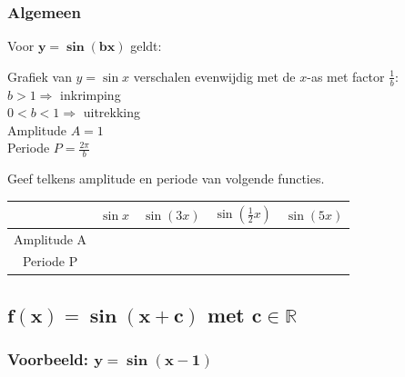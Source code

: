 \documentclass[a4paper,12pt,twoside]{article}
\begin{document}
\needspace{3cm}
\subsubsection*{Algemeen}

\begin{mdframed}[nobreak=true]
  Voor $\boldsymbol{y=\sin (bx)}$ geldt:
  \begin{center}
    Grafiek van $y=\sin x$ verschalen evenwijdig met de $x$-as met factor $\frac{1}{b}$:\\
    $b>1 \Rightarrow$ inkrimping\\
    $0<b<1 \Rightarrow$ uitrekking \\
    Amplitude $A = 1$\\
    Periode $P = \frac{2\pi}{b}$
  \end{center}
\end{mdframed}

\begin{oefening}
  Geef telkens amplitude en periode van volgende functies.
  \begin{center}
    \begin{tabular}{c|c|c|c|c}
      & $\sin x$ & $\sin (3x)$ &$\sin (\frac{1}{2}x)$ & $\sin (5x)$\\
      \hline
      Amplitude A &\hspace*{2cm} &\hspace*{2cm}&\hspace*{2cm}&\hspace*{2cm}\\
      \hline
      Periode P &\hspace*{2cm}&\hspace*{2cm}&\hspace*{2cm}&\hspace*{2cm}
    \end{tabular}
  \end{center}
\end{oefening}

\subsection{$\boldsymbol{f(x)=\sin (x+c)}$ met $\boldsymbol{c\in \mathbb{R}}$}

\subsubsection*{Voorbeeld: $\boldsymbol{y=\sin (x-1)}$}
\end{document}
